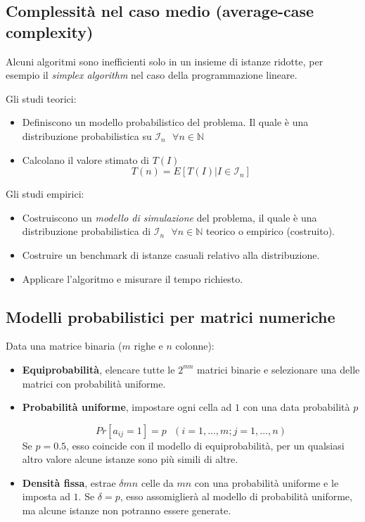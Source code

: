 \documentclass{article}
\begin{document}
\subsection{Complessità nel caso medio (average-case complexity)}
Alcuni algoritmi sono inefficienti solo in un insieme di istanze ridotte, per esempio
il \textit{simplex algorithm} nel caso della programmazione lineare.

Gli studi teorici:
\begin{itemize}
    \item Definiscono un modello probabilistico del problema. Il quale è una
          distribuzione probabilistica su $\mathcal{I}_n\text{ }\forall n\in\mathbb{N}$
    \item Calcolano il valore stimato di $T(I)$
          $$T(n)=E[T(I)|I\in\mathcal{I}_n]$$
\end{itemize}

Gli studi empirici:
\begin{itemize}
    \item Costruiscono un \textit{modello di simulazione} del problema,
          il quale è una distribuzione probabilistica di $\mathcal{I}_n\text{ }\forall n\in\mathbb{N}$
          teorico o empirico (costruito).
    \item Costruire un benchmark di istanze casuali relativo alla distribuzione.
    \item Applicare l'algoritmo e misurare il tempo richiesto.
\end{itemize}

\subsection{Modelli probabilistici per matrici numeriche}
Data una matrice binaria ($m$ righe e $n$ colonne):
\begin{itemize}
    \item \textbf{Equiprobabilità}, elencare tutte le $2^{mn}$ matrici binarie e
          selezionare una delle matrici con probabilità uniforme.
    \item \textbf{Probabilità uniforme}, impostare ogni cella ad $1$ con una data
          probabilità $p$

          $$Pr[a_{ij}=1]=p\text{   }(i=1,...,m;j=1,...,n)$$
          Se $p=0.5$, esso coincide con il modello di equiprobabilità, per un qualsiasi
          altro valore alcune istanze sono più simili di altre.
    \item \textbf{Densità fissa}, estrae $\delta mn$ celle da $mn$ con una
          probabilità uniforme e le imposta ad $1$.
          Se $\delta=p$, esso assomiglierà al modello di probabilità uniforme, ma alcune
          istanze non potranno essere generate.

\end{itemize}
\end{document}
